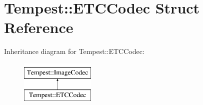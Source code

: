 \hypertarget{struct_tempest_1_1_e_t_c_codec}{\section{Tempest\+:\+:E\+T\+C\+Codec Struct Reference}
\label{struct_tempest_1_1_e_t_c_codec}
}
Inheritance diagram for Tempest\+:\+:E\+T\+C\+Codec\+:\begin{figure}[H]
\begin{center}
\leavevmode
\includegraphics[height=2.000000cm]{struct_tempest_1_1_e_t_c_codec}
\end{center}
\end{figure}
